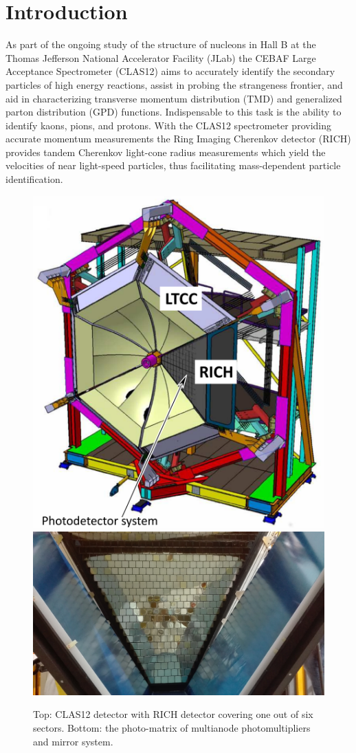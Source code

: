 \section{Introduction}
As part of the ongoing study of the structure of nucleons \cite{Avakian:2010ae}  in Hall B at the Thomas Jefferson National Accelerator Facility (JLab)  the CEBAF Large Acceptance Spectrometer (CLAS12) \cite{Burkert:2020akg} aims to accurately identify the secondary particles of high energy reactions, assist in probing the strangeness frontier, and aid in characterizing transverse momentum distribution (TMD) and generalized parton distribution (GPD) functions. Indispensable to this task is the ability to identify kaons, pions, and protons.  With the CLAS12 spectrometer providing accurate momentum measurements the Ring Imaging Cherenkov detector (RICH) \cite{Contalbrigo:2020,Contalbrigo:2020snw,Mirazita:2017vav,Contalbrigo:2014rqa} provides tandem Cherenkov light-cone radius measurements which yield the velocities of near light-speed particles, thus facilitating mass-dependent particle identification.

\begin{figure}[h!bt]
	\centering
	\includegraphics[width=0.65\linewidth]{figures/RICHdetector.pdf}
	\includegraphics[width=0.65\linewidth]{figures/RICHpanel_front.png}
	\caption{Top: CLAS12 detector with RICH detector covering one out of six sectors. Bottom: the photo-matrix of multianode photomultipliers and mirror system.}
	\label{fig:RICHdetector}
\end{figure}

